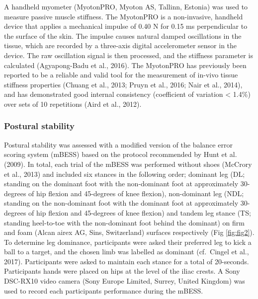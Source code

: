 \documentclass[
  english,
  man]{apa6}
\begin{document}
A handheld myometer (MyotonPRO, Myoton AS, Tallinn, Estonia) was used to measure passive muscle stiffness.
The MyotonPRO is a non-invasive, handheld device that applies a mechanical impulse of 0.40 N for 0.15 ms perpendicular to the surface of the skin.
The impulse causes natural damped oscillations in the tissue, which are recorded by a three-axis digital accelerometer sensor in the device.
The raw oscillation signal is then processed, and the stiffness parameter is calculated (Agyapong-Badu et al., 2016).
The MyotonPRO has previously been reported to be a reliable and valid tool for the measurement of in-vivo tissue stiffness properties (Chuang et al., 2013; Pruyn et al., 2016; Nair et al., 2014), and has demonstrated good internal consistency (coefficient of variation \textless{} 1.4\%) over sets of 10 repetitions (Aird et al., 2012).

\hypertarget{postural-stability}{%
\subsubsection{Postural stability}\label{postural-stability}}

Postural stability was assessed with a modified version of the balance error scoring system (mBESS) based on the protocol recommended by Hunt et al. (2009).
In total, each trial of the mBESS was performed without shoes (McCrory et al., 2013) and included six stances in the following order; dominant leg (DL; standing on the dominant foot with the non-dominant foot at approximately 30-degrees of hip flexion and 45-degrees of knee flexion),
non-dominant leg (NDL; standing on the non-dominant foot with the dominant foot at approximately 30-degrees of hip flexion and 45-degrees of knee flexion)
and tandem leg stance (TS; standing heel-to-toe with the non-dominant foot behind the dominant) on firm and foam (Alcan airex AG, Sins, Switzerland) surfaces respectively (Fig \ref{fig:fig2}).
To determine leg dominance, participants were asked their preferred leg to kick a ball to a target, and the chosen limb was labelled as dominant (cf.~Cingel et al., 2017).
Participants were asked to maintain each stance for a total of 20-seconds.
Participants hands were placed on hips at the level of the iliac crests.
A Sony DSC-RX10 video camera (Sony Europe Limited, Surrey, United Kingdom) was used to record each participants performance during the mBESS.
\end{document}
